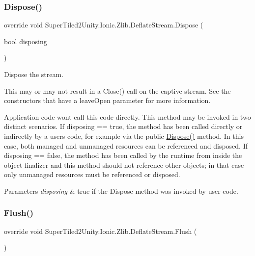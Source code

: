 \subsubsection{\texorpdfstring{Dispose()}{Dispose()}}
{\footnotesize\ttfamily override void Super\+Tiled2\+Unity.\+Ionic.\+Zlib.\+Deflate\+Stream.\+Dispose (\begin{DoxyParamCaption}\item[{bool}]{disposing }\end{DoxyParamCaption})\hspace{0.3cm}{\ttfamily [protected]}}



Dispose the stream. 

This may or may not result in a {\ttfamily Close()} call on the captive stream. See the constructors that have a {\ttfamily leave\+Open} parameter for more information. 

Application code won\textquotesingle{}t call this code directly. This method may be invoked in two distinct scenarios. If disposing == true, the method has been called directly or indirectly by a user\textquotesingle{}s code, for example via the public \mbox{\hyperlink{class_super_tiled2_unity_1_1_ionic_1_1_zlib_1_1_deflate_stream_a31a30e285b2901fdc31f512a4202b9c7}{Dispose()}} method. In this case, both managed and unmanaged resources can be referenced and disposed. If disposing == false, the method has been called by the runtime from inside the object finalizer and this method should not reference other objects; in that case only unmanaged resources must be referenced or disposed. 


\begin{DoxyParams}{Parameters}
{\em disposing} & true if the Dispose method was invoked by user code. \\
\hline
\end{DoxyParams}
\mbox{\label{class_super_tiled2_unity_1_1_ionic_1_1_zlib_1_1_deflate_stream_a5c891796c2fa4b363c95e7c8462e0858}} 
\subsubsection{\texorpdfstring{Flush()}{Flush()}}
{\footnotesize\ttfamily override void Super\+Tiled2\+Unity.\+Ionic.\+Zlib.\+Deflate\+Stream.\+Flush (\begin{DoxyParamCaption}{ }\end{DoxyParamCaption})}



